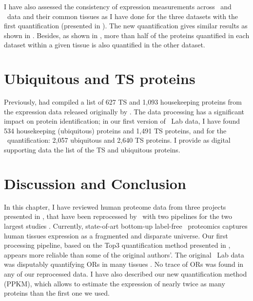 I have also assessed the consistency of expression measurements
across \pandey\ and \kuster\ data  and their common tissues
as I have done for the three datasets with the first quantification
(presented in ).
The new quantification gives similar results
as shown in .
Besides, as shown in ,
more than half of the proteins quantified in each dataset
within a given tissue is also quantified in the other dataset.\mybr\


\begin{comment}
\citet{Nesvizhskii2003-ls} propose a method that may seem alike,
but their method apportions the degenerate peptides
among all corresponding proteins to estimate their presence likelihood in an experiment.
They focus on the identification while the quantification remains overlooked.\mybr\
\end{comment}

\section{Ubiquitous and TS proteins}
Previously, \citet{Liu2014-xr} had compiled a list of 627 \gls{TS} and
1,093 housekeeping proteins
from the expression data released originally by \citet{PandeyData}.
The data processing has a significant impact on protein identification;
in our first version of \pandey\ Lab data,
I have found 534 housekeeping (ubiquitous) proteins and 1,491 \gls{TS} proteins,
and for the \PPKM\ quantification: 2,057 ubiquitous and 2,640 \gls{TS} proteins.
I provide as digital supporting data the list of the \gls{TS} and
ubiquitous proteins.\mybr\


\section{Discussion and Conclusion}

In this chapter, I have reviewed human proteome data
from three projects presented in ,
that have been reprocessed by \james\ with two pipelines
for the two largest studies \citet{PandeyData,KusterData}.
Currently, state-of-art bottom-up label-free \ms\ proteomics captures
human tissues expression as a fragmented and disparate universe.
Our first processing pipeline,
based on the Top3 quantification method presented in ,
appears more reliable than some of the original authors'.
The original \pandey\ Lab data was disputably quantifying \glspl{OR} in many tissues
\mycite{Ezkurdia2014-qx}.
No trace of \glspl{OR} was found in any of our reprocessed data.
I have also described our new quantification method (\gls{PPKM}),
which allows to estimate the expression of nearly twice as many proteins
than the first one we used.\mybr\

